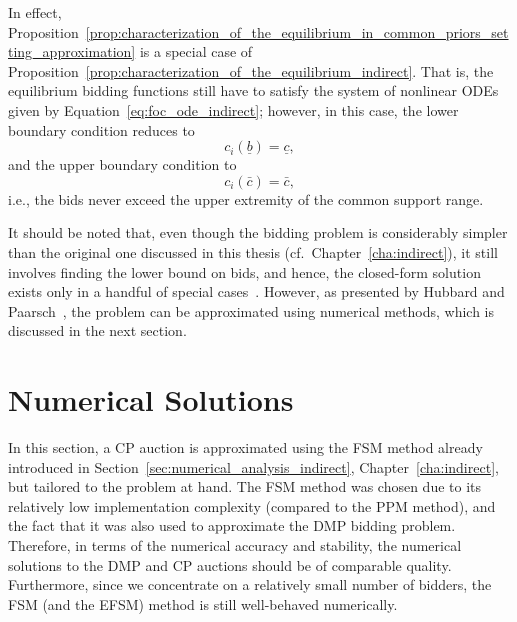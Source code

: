 In effect, Proposition~\ref{prop:characterization_of_the_equilibrium_in_common_priors_setting_approximation} is a special case of Proposition~\ref{prop:characterization_of_the_equilibrium_indirect}. That is, the equilibrium bidding functions still have to satisfy the system of nonlinear ODEs given by Equation~\eqref{eq:foc_ode_indirect}; however, in this case, the lower boundary condition reduces to
\begin{equation*}
  c_i(\underline{b}) = \underline{c},
\end{equation*}
and the upper boundary condition to
\begin{equation*}
  c_i(\bar{c}) = \bar{c},
\end{equation*}
i.e., the bids never exceed the upper extremity of the common support range.

It should be noted that, even though the bidding problem is considerably simpler than the original one discussed in this thesis (cf.~Chapter~\ref{cha:indirect}), it still involves finding the lower bound on bids, and hence, the closed-form solution exists only in a handful of special cases~\cite{Krishna10,HubbardPaarsch2011}. However, as presented by Hubbard and Paarsch~\cite{HubbardPaarsch2011}, the problem can be approximated using numerical methods, which is discussed in the next section.

\section{Numerical Solutions} %
\label{sec:numerical_solutions}
In this section, a CP auction is approximated using the FSM method already introduced in Section~\ref{sec:numerical_analysis_indirect}, Chapter~\ref{cha:indirect}, but tailored to the problem at hand. The FSM method was chosen due to its relatively low implementation complexity (compared to the PPM method), and the fact that it was also used to approximate the DMP bidding problem. Therefore, in terms of the numerical accuracy and stability, the numerical solutions to the DMP and CP auctions should be of comparable quality. Furthermore, since we concentrate on a relatively small number of bidders, the FSM (and the EFSM) method is still well-behaved numerically.

